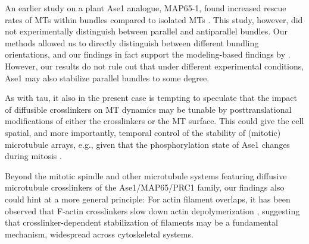 An earlier study on a plant Ase1 analogue, MAP65-1, found increased rescue rates of MTs within bundles compared to isolated MTs \parencite{Stoppin-Mellet2013}. This study, however, did not experimentally distinguish between parallel and antiparallel bundles. Our methods allowed us to directly distinguish between different bundling orientations, and our findings in fact support the modeling-based findings by \parencite{Stoppin-Mellet2013}. However, our results do not rule out that under different experimental conditions, Ase1 may also stabilize parallel bundles to some degree.\par

As with tau, it also in the present case is tempting to speculate that the impact of diffusible crosslinkers on MT dynamics may be tunable by posttranslational modifications of either the crosslinkers or the MT surface. This could give the cell spatial, and more importantly, temporal control of the stability of (mitotic) microtubule arrays, e.g., given that the phosphorylation state of Ase1 changes during mitosis . \par

Beyond the mitotic spindle and other microtubule systems featuring diffusive microtubule crosslinkers of the Ase1/MAP65/PRC1 family, our findings also could hint at a more general principle: For actin filament overlaps, it has been observed that F-actin crosslinkers slow down actin depolymerization \parencite{maul2003eplin,schmoller2011slow}, suggesting that crosslinker-dependent stabilization of filaments may be a fundamental mechanism, widespread across cytoskeletal systems.